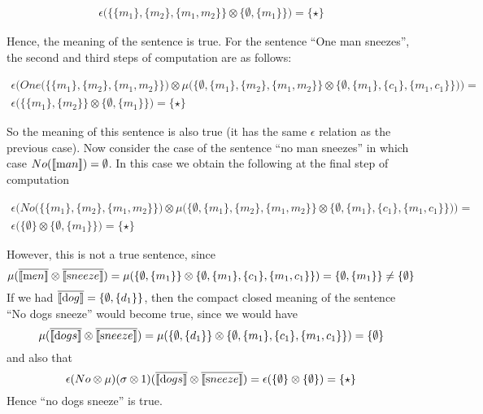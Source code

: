 \begin{align*}
\epsilon\Big(\{\{m_1\}, \{m_2\}, \{m_1, m_2\}\}  \otimes \{\emptyset, \{m_1\}\}\Big) = \{\star\}
\end{align*}

\noindent
Hence, the meaning of the sentence is true.  For the sentence ``One man sneezes'',  the second and third steps of computation are as follows:

\begin{align*}
\epsilon\Big( One\Big ( \{\{m_1\}, \{m_2\}, \{m_1, m_2\}\} \Big) \otimes \mu \Big( \{\emptyset, \{m_1\}, \{m_2\}, \{m_1, m_2\}\}  \otimes \{\emptyset, \{m_1\}, \{c_1\}, \{m_1, c_1\}\} \Big)\Big) =&\\
\epsilon \Big(\{\{m_1\}, \{m_2\}\}  \otimes \{\emptyset, \{m_1\}\}\Big) = \{\star\}
\end{align*}

\noindent
So the meaning of this sentence is also true (it has the same $\epsilon$ relation as the previous case). Now consider the case of the  sentence ``no man sneezes'' in which case $No ([\![ \text man ]\!]) = \emptyset$. In this case we obtain  the following at the final step of computation

\begin{align*}
\epsilon\Big( No\Big ( \{\{m_1\}, \{m_2\}, \{m_1, m_2\}\} \Big) \otimes \mu \Big( \{\emptyset, \{m_1\}, \{m_2\}, \{m_1, m_2\}\}  \otimes \{\emptyset, \{m_1\}, \{c_1\}, \{m_1, c_1\}\} \Big)\Big) =&\\
\epsilon \Big(\{\emptyset\}  \otimes \{\emptyset, \{m_1\}\}\Big) = \{\star\}
\end{align*}

\noindent
However, this is not a true sentence, since  
\[
\mu(\overline{[\![ \text men ]\!]} \otimes \overline{[\![ \text sneeze ]\!]}) = \mu(\{\emptyset, \{m_1\}\} \otimes \{\emptyset, \{m_1\}, \{c_1\}, \{m_1, c_1\}\}) = \{\emptyset, \{m_1\}\}   \neq \{\emptyset\}
\]
 If we had $\overline{[\![ \text dog ]\!]} = \{\emptyset, \{d_1\}\}$, then the compact closed meaning of the sentence ``No dogs sneeze''  would become true, since we would have
\[
\mu(\overline{[\![ \text dogs ]\!]} \otimes \overline{[\![ \text sneeze ]\!]}) = \mu(\{\emptyset, \{d_1\}\} \otimes \{\emptyset, \{m_1\}, \{c_1\}, \{m_1, c_1\}\}) = \{\emptyset\}
\]
and also that  
\[
\epsilon(No \otimes \mu)(\sigma \otimes 1) (\overline{[\![ \text dogs ]\!]} \otimes \overline{[\![ \text sneeze ]\!]})=  \epsilon(\{\emptyset\}  \otimes \{\emptyset\}) = \{\star\}
\]
Hence ``no dogs sneeze'' is true. 

